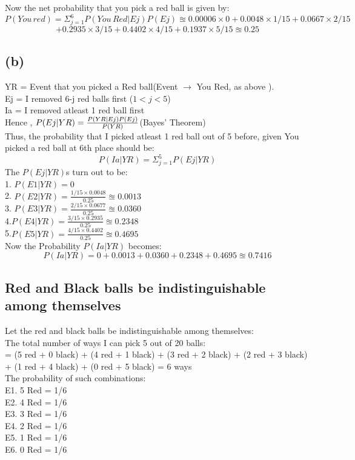 \documentclass[11pt]{article}
\begin{document}
	Now the net probability that you pick a red ball is given by:
	\[
		P(You\, red) = \Sigma_{j=1}^{6}P(You\,Red|Ej)P(Ej)
		\approxeq 0.00006\times0 + 0.0048\times1/15 + 0.0667\times2/15 
	\]
	\[
		+ 0.2935 \times 3/15 + 0.4402 \times 4/15 + 0.1937 \times 5/15 \approxeq \boxed{0.25}
	\]
    \subsection*{(b)}
	YR = Event that you picked a Red ball(Event \(\rightarrow\) You Red, as above ).\\
	Ej = I removed 6-j red balls first (\(1<j<5\))\\
	Ia = I removed atleast 1 red ball first\\
	
	Hence , \(P(Ej|YR) = \frac{P(YR|Ej)P(Ej)}{P(YR)}\dotfill\)(Bayes' Theorem)\\
	
	Thus, the probability that I picked atleast 1 red ball out of 5 before, given You picked a red ball at 6th place should be:
	\[
	  P(Ia|YR) = \Sigma_{j=1}^5 P(Ej|YR)
	\]
	The \( P(Ej|YR)\)s turn out to be:\\
	1. \(P(E1|YR) = 0\)\\
	2. \(P(E2|YR) = \frac{1/15 \times 0.0048}{0.25}\approxeq 0.0013\)\\
	3. \(P(E3|YR) = \frac{2/15 \times 0.0677}{0.25} \approxeq 0.0360 \)\\
	4.\(P(E4|YR) = \frac{3/15 \times0.2935}{0.25}\approxeq 0.2348 \)\\
	5.\(P(E5|YR) = \frac{4/15\times 0.4402}{0.25}\approxeq0.4695 \)\\
	
	Now the Probability \( P(Ia|YR) \) becomes:\\
	\[
		P(Ia|YR)= 0 + 0.0013 + 0.0360 + 0.2348 + 0.4695 
		\approxeq \boxed{0.7416}
	\]
	
	\subsection*{Red and Black balls be indistinguishable among themselves}
	
	Let the red and black balls be indistinguishable among themselves:\\
	The total number of ways I can pick 5 out of 20 balls:\\
	= (5 red + 0 black) + (4 red + 1 black) + (3 red + 2 black) + (2 red + 3 black) + (1 red + 4 black) + (0 red + 5 black) = 6 ways\\
	The probability of such combinations:\\
	E1. 5 Red = 1/6\\
	E2. 4 Red = 1/6\\
	E3. 3 Red = 1/6\\
	E4. 2 Red = 1/6\\
	E5. 1 Red = 1/6\\
	E6. 0 Red = 1/6\\
	
\end{document}
